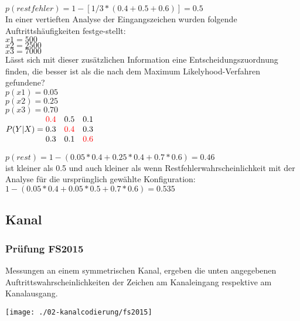 $p(restfehler) = 1 - [1/3*(0.4+0.5+0.6)] = 0.5$\\

In einer vertieften Analyse der Eingangszeichen wurden folgende Auftrittshäufigkeiten festge-stellt:\\
$x1 = 500$\\
$x2 = 2500$\\
$x3 = 7000$\\

Lässt sich mit dieser zusätzlichen Information eine Entscheidungszuordnung finden, die besser ist als die nach dem Maximum Likelyhood-Verfahren gefundene?\\
$p(x1) = 0.05$\\
$p(x2) = 0.25$\\
$p(x3) = 0.70$\\


$P(Y|X) = \begin{matrix}
    \textcolor{red}{0.4} & 0.5 & 0.1\\
    0.3 & \textcolor{red}{0.4} & 0.3\\
    0.3 & 0.1 & \textcolor{red}{0.6}
\end{matrix}$

$p(rest) = 1-(0.05*0.4 + 0.25*0.4 + 0.7*0.6) = 0.46 $\\

ist kleiner als 0.5 und auch kleiner als wenn Restfehlerwahrscheinlichkeit mit der Analyse für 	die ursprünglich gewählte Konfiguration:\\
$1 - (0.05*0.4 + 0.05*0.5 + 0.7*0.6) = 0.535$

\columnbreak

\subsection{Kanal}
\subsubsection{Prüfung FS2015}
Messungen an einem symmetrischen Kanal, ergeben die unten angegebenen Auftrittswahrscheinlichkeiten der Zeichen am Kanaleingang respektive am Kanalausgang.\\
\begin{center}
    \vspace{-8pt}
    \texttt{[image: ./02-kanalcodierung/fs2015]}
    \vspace{-8pt}
\end{center}

